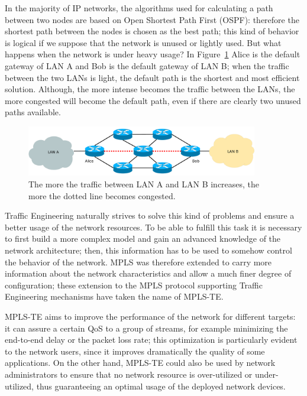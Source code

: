 \documentclass[10pt,a4paper]{report}
\begin{document}
In the majority of IP networks, the algorithms used for calculating a
path between two nodes are based on Open Shortest Path First (OSPF):
therefore the shortest path between the nodes is chosen as the best
path; this kind of behavior is logical if we suppose that the network
is unused or lightly used. But what happens when the network is under
heavy usage? In Figure~\ref{fig:mpls_te} Alice is the default gateway
of LAN A and Bob is the default gateway of LAN B; when the traffic
between the two LANs is light, the default path is the shortest and
most efficient solution. Although, the more intense becomes the
traffic between the LANs, the more congested will become the default
path, even if there are clearly two unused paths available.

\begin{figure}[!hbp]
  \centering
  \includegraphics[width=0.9\textwidth]{img/mpls_te}
  \caption[Traffic Engineering example]{The more the traffic between
    LAN A and LAN B increases, the more the dotted line becomes
    congested.}
  \label{fig:mpls_te}
\end{figure}

Traffic Engineering naturally strives to solve this kind of problems
and ensure a better usage of the network resources. To be able to
fulfill this task it is necessary to first build a more complex model
and gain an advanced knowledge of the network architecture; then, this
information has to be used to somehow control the behavior of the
network. MPLS was therefore extended to carry more information about
the network characteristics and allow a much finer degree of
configuration; these extension to the MPLS protocol supporting Traffic
Engineering mechanisms have taken the name of MPLS-TE.

MPLS-TE aims to improve the performance of the network for different
targets: it can assure a certain QoS to a group of streams, for
example minimizing the end-to-end delay or the packet loss rate; this
optimization is particularly evident to the network users, since it
improves dramatically the quality of some applications. On the other
hand, MPLS-TE could also be used by network administrators to ensure
that no network resource is over-utilized or under-utilized, thus
guaranteeing an optimal usage of the deployed network devices.
\end{document}
